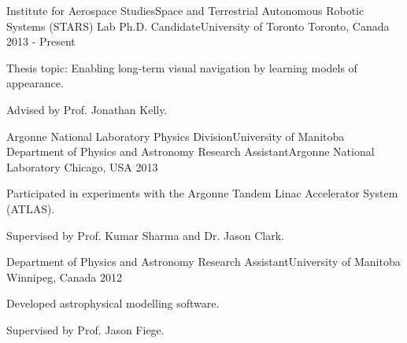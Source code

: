 

\begin{cventries}

  \cventry
    {Institute for Aerospace Studies{\enskip\cdotp\enskip}Space and Terrestrial Autonomous Robotic Systems (STARS) Lab} %
    {Ph.D. Candidate{\enskip\cdotp\enskip}University of Toronto} %
    {Toronto, Canada} %
    {2013 - Present} %
    {
      \begin{cvitems} %
        \item {Thesis topic: Enabling long-term visual navigation by learning models of appearance.}
        \item {Advised by Prof. Jonathan Kelly.}
      \end{cvitems}
    }

  \cventry
    {Argonne National Laboratory Physics Division{\enskip\cdotp\enskip}University of Manitoba Department of Physics and Astronomy} %
    {Research Assistant{\enskip\cdotp\enskip}Argonne National Laboratory} %
    {Chicago, USA} %
    {2013} %
    {
      \begin{cvitems} %
        \item {Participated in experiments with the Argonne Tandem Linac Accelerator System (ATLAS).}
        \item {Supervised by Prof. Kumar Sharma and Dr. Jason Clark.}
      \end{cvitems}
    }
  
    \cventry
    {Department of Physics and Astronomy} %
    {Research Assistant{\enskip\cdotp\enskip}University of Manitoba} %
    {Winnipeg, Canada} %
    {2012} %
    {
      \begin{cvitems} %
        \item {Developed astrophysical modelling software.}
        \item {Supervised by Prof. Jason Fiege.}
      \end{cvitems}
    }

\end{cventries}
